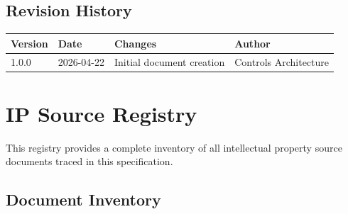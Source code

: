\section*{Revision History}

\begin{tabularx}{\textwidth}{@{}llXl@{}}
\toprule
\textbf{Version} & \textbf{Date} & \textbf{Changes} & \textbf{Author} \\
\midrule
1.0.0 & 2026-04-22 & Initial document creation & Controls Architecture \\
\bottomrule
\end{tabularx}

\newpage


\chapter*{IP Source Registry}
\label{chap:ip-registry}

This registry provides a complete inventory of all intellectual property source documents traced in this specification.

\section*{Document Inventory}

